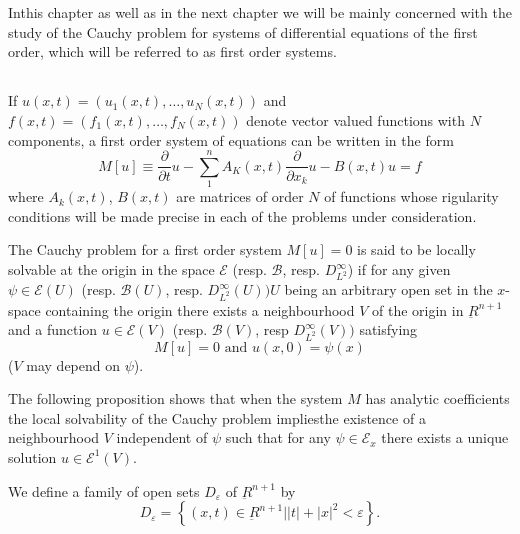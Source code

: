 \chapter{}\label{chap2}

In\pageoriginale this chapter as well as in the next chapter we will be mainly
concerned with the study of the Cauchy problem for systems of
differen\-tial equations of the first order,  which will be referred to
as first order systems. 

\section{}\label{chap2-sec1}

If $u(x,  t) = (u_1(x,  t),  \ldots ,  u_N(x,  t))$ and  $f(x,  t) =
(f_1(x,  t),  \ldots, f_N(x , t))$ denote vector valued functions with
$N$ components,  a first order system of equations can be written in
the form 
\begin{equation}
M [u] \equiv \frac{\partial}{ \partial t} u-\sum^n_1 A_K (x,  t)
\frac{\partial}{ \partial x_k} u - B(x, t) u = f \tag{1.1}\label{chap2-eq1.1} 
\end{equation}
where $A_k (x, t)$, $B(x, t)$ are matrices of order $N$ of functions
whose rigularity conditions will be made precise in each of the
problems under consideration. 

\begin{defi*}
The Cauchy problem for a first order system $M [u] = 0$ is said to be
locally solvable at the origin in the space $\mathscr{E}$ (resp. $\mathscr{B}$,
resp. $D^\infty_{L^2}$) if for any given $\psi \in
\mathscr{E} (U)$ (resp. $\mathscr{B}(U)$, resp. $D^\infty_{L^2}(U))U$
being an arbitrary open set in the $x$-space containing the origin 
there exists a neighbourhood $V$ of the origin in $\underbar{R}^{n+1}$
and a function $u \in \mathscr{E}(V)$ (resp. $\mathscr{B}(V)$,
resp $D^\infty_{L^2}(V))$ satisfying 
$$
M[u] = 0 \text{ and } u(x, 0) = \psi (x)
$$
($V$ may depend on $\psi$).
\end{defi*}

The following proposition shows that when the system $M$ has analytic
coefficients the local solvability of the Cauchy problem
implies\pageoriginale the 
existence of a neighbourhood $V$ independent of $\psi$ such that for
any $\psi \in \mathscr{E}_x$  there exists a unique solution
$u \in \mathscr{E}^1 (V)$. 

We define a family of open sets $D_\varepsilon$ of
$\underbar{R}^{n+1}$ by 
\begin{equation}
D_\varepsilon = \left\{ (x, t) \in \underbar{R}^{n+1}\Big| |t| +
|x|^2 < \varepsilon\right\}. \tag{1.2}\label{chap2-eq1.2} 
\end{equation}

